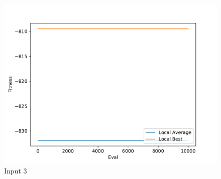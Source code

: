 \documentclass{standalone}
\begin{document}
\begin{figure}[!htb]
	\caption{Input 3}
	\label{fig:graph_3048}
	\includegraphics[width=\textwidth]{../graphs/graphs/3048.pdf}
\end{figure}
\end{document}
